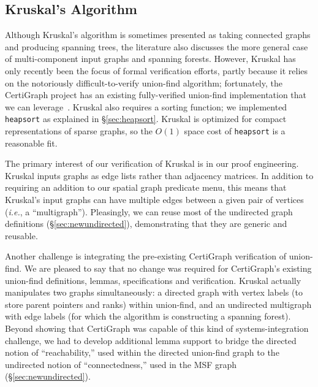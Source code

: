 \subsection{Kruskal's Algorithm}
\label{sec:kruskal}

Although Kruskal's algorithm is sometimes presented as taking connected graphs and producing spanning trees, the literature also discusses the more general case of multi-component input graphs and spanning forests.  However, Kruskal has only recently been the focus of formal verification efforts, partly because it relies on the notoriously difficult-to-verify union-find algorithm; fortunately, the CertiGraph project has an existing fully-verified union-find implementation that we can leverage~\cite{DBLP:journals/pacmpl/WangCMH19}.  Kruskal also requires a sorting function; we implemented \texttt{heapsort} as explained in \S\ref{sec:heapsort}.  Kruskal is optimized for compact representations of sparse graphs, so the $O(1)$ space cost of \texttt{heapsort} is a reasonable fit.  %

The primary interest of our verification of Kruskal is in our proof engineering.  Kruskal inputs graphs as edge lists rather than adjacency matrices.  In addition to requiring an addition to our spatial graph predicate menu, this means that Kruskal's input graphs can have multiple edges between a given pair of vertices (\emph{i.e.}, a ``multigraph'').  Pleasingly, we can reuse most of the undirected graph definitions (\S\ref{sec:newundirected}), demonstrating that they are generic and reusable.

Another challenge is integrating the pre-existing CertiGraph verification of union-find.  We are pleased to say that no change was required for CertiGraph's existing union-find definitions, lemmas, specifications and verification.  Kruskal actually manipulates two graphs simultaneously: a directed graph with vertex labels (to store parent pointers and ranks) within union-find, and an undirected multigraph with edge labels (for which the algorithm is constructing a spanning forest).  Beyond showing that CertiGraph was capable of this kind of systems-integration challenge, we had to develop additional lemma support to bridge the directed notion of ``reachability,'' used within the directed union-find graph to the undirected notion of ``connectedness,'' used in the MSF graph (\S\ref{sec:newundirected}).


